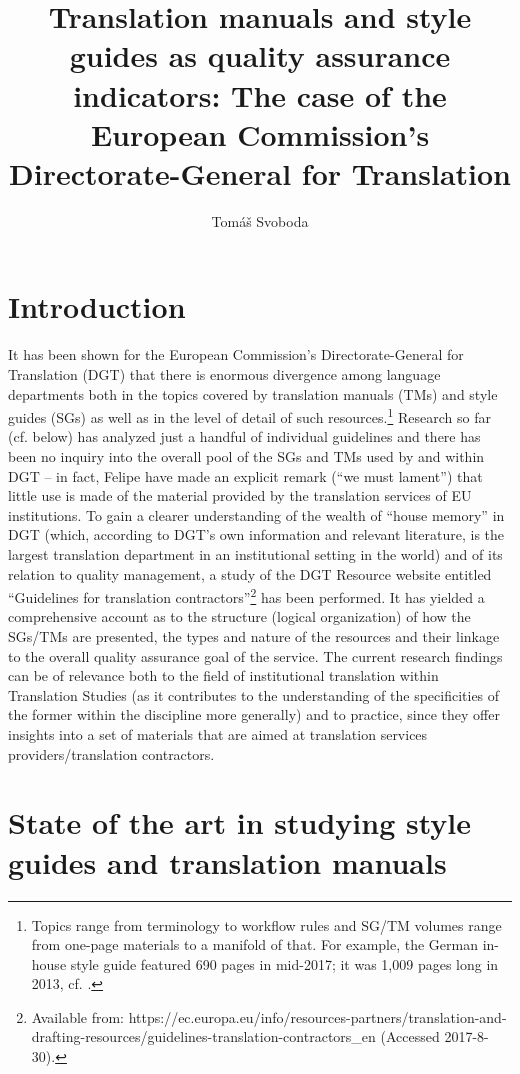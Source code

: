 \documentclass[output=paper]{langsci/langscibook}
\author{Tomáš Svoboda\affiliation{Charles University, Prague}}
\title{Translation manuals and style guides as quality assurance indicators: The case of the European Commission’s Directorate-General for Translation}
\begin{document}
\section{Introduction}\label{sec:svoboda:1} 

It has been shown for the European Commission’s Directorate-General for Translation (DGT) that there is enormous divergence among language departments both in the topics covered by translation manuals (TMs) and style guides (SGs) as well as in the level of detail of such resources.\footnote{Topics range from terminology to workflow rules and SG/TM volumes range from one-page materials to a manifold of that. For example, the German in-house style guide featured 690 pages in mid-2017; it was 1,009 pages long in 2013, cf. \citet{Svoboda2013}.} Research so far (cf.  below) has analyzed just a handful of individual guidelines and there has been no inquiry into the overall pool of the SGs and TMs used by and within DGT – in fact, Felipe \citet[56]{FelipeBoto2009} have made an explicit remark (“we must lament”) that little use is made of the material provided by the translation services of EU institutions. To gain a clearer understanding of the wealth of “house memory” in DGT (which, according to DGT’s own information and relevant literature, is the largest translation department in an institutional setting in the world) and of its relation to quality management, a study of the DGT Resource website entitled “Guidelines for translation contractors”\footnote{Available from: https://ec.europa.eu/info/resources-partners/translation-and-drafting-resources/guidelines-translation-contractors\_en (Accessed 2017-8-30).} has been performed. It has yielded a comprehensive account as to the structure (logical organization) of how the SGs/TMs are presented, the types and nature of the resources and their linkage to the overall quality assurance goal of the service. The current research findings can be of relevance both to the field of institutional translation within Translation Studies (as it contributes to the understanding of the specificities of the former within the discipline more generally) and to practice, since they offer insights into a set of materials that are aimed at translation services providers/translation contractors.

\section{State of the art in studying style guides and translation manuals}\label{sec:svoboda:2}
\end{document}
